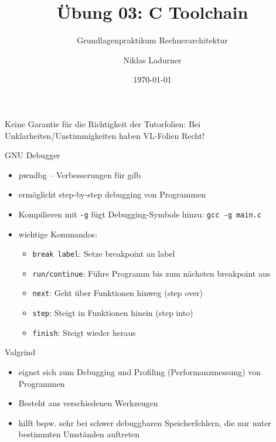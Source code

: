 \documentclass[
  german,            %
  aspectratio=169,    %
]{tumbeamer}
\title{Übung 03: C Toolchain}
\subtitle{Grundlagenpraktikum Rechnerarchitektur}
\author{Niklas Ladurner}
\institute{\theChairName\\\theDepartmentName\\\theUniversityName}
\date[\today]{\today}
\begin{document}
\maketitle

\begin{frame}[c]{}{}
  \begin{center}
    \LARGE  Keine Garantie für die Richtigkeit der Tutorfolien: Bei Unklarheiten/Unstimmigkeiten
    haben VL-Folien Recht!
  \end{center}
\end{frame}



\begin{frame}[c, fragile]{GNU Debugger}{}
  \begin{itemize}
    \item pwndbg -- Verbesserungen für gdb
    \item ermöglicht step-by-step debugging von Programmen
    \item Kompilieren mit \verb|-g| fügt Debugging-Symbole hinzu: \verb|gcc -g main.c|
    \item wichtige Kommandos:
    \begin{itemize}
      \item \verb|break label|: Setze breakpoint an label
      \item \verb|run/continue|: Führe Programm bis zum nächsten breakpoint aus
      \item \verb|next|: Geht über Funktionen hinweg (step over)
      \item \verb|step|: Steigt in Funktionen hinein (step into)
      \item \verb|finish|: Steigt wieder heraus
    \end{itemize}
  \end{itemize}
\end{frame}

\begin{frame}[c, fragile]{Valgrind}{}
  \begin{itemize}
    \item eignet sich zum Debugging und Profiling (Performanzmessung) von Programmen
    \item Besteht aus verschiedenen Werkzeugen
    \item hilft bspw. sehr bei schwer debuggbaren Speicherfehlern, die nur unter bestimmten 
    Umständen auftreten
  \end{itemize}
\end{frame}
\end{document}

